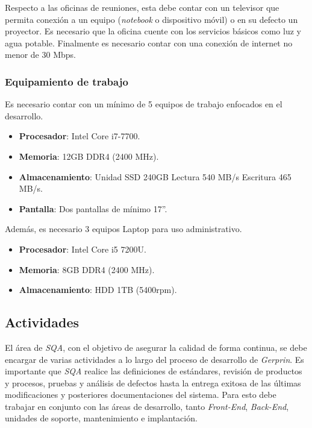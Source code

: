 Respecto a las oficinas de reuniones, esta debe contar con un televisor que permita conexión a un equipo (\emph{notebook} o dispositivo móvil) o en su defecto un proyector.
Es necesario que la oficina cuente con los servicios básicos como luz y agua potable. Finalmente es necesario contar con una conexión de internet no menor de 30 Mbps.

\subsubsection{Equipamiento de trabajo}

Es necesario contar con un mínimo de 5 equipos de trabajo enfocados en el desarrollo.

	\begin{itemize}
		\item 
		\textbf{Procesador}: Intel Core i7-7700.
		\item 
		\textbf{Memoria}: 12GB DDR4 (2400 MHz).
		\item 
		\textbf{Almacenamiento}: Unidad SSD 240GB Lectura 540 MB/s Escritura 465 MB/s.
		\item 
		\textbf{Pantalla}: Dos pantallas de mínimo 17”.
	\end{itemize}

Además, es necesario  3 equipos Laptop para uso administrativo. 

	\begin{itemize}
		\item 
		\textbf{Procesador}: Intel Core i5 7200U.
		\item 
		\textbf{Memoria}: 8GB DDR4 (2400 MHz).
		\item 
		\textbf{Almacenamiento}: HDD 1TB (5400rpm).
	\end{itemize}

\subsection{Actividades}

El área de \emph{SQA}, con el objetivo de asegurar la calidad de forma continua, se debe encargar de varias actividades a lo largo del proceso de desarrollo de \emph{Gerprin}. Es importante que \emph{SQA} realice las definiciones de estándares, revisión de productos y procesos, pruebas y análisis de defectos hasta la entrega exitosa de las últimas modificaciones y posteriores documentaciones del sistema. Para esto debe trabajar en conjunto con las áreas de desarrollo, tanto \emph{Front-End}, \emph{Back-End}, unidades de soporte, mantenimiento e implantación.

